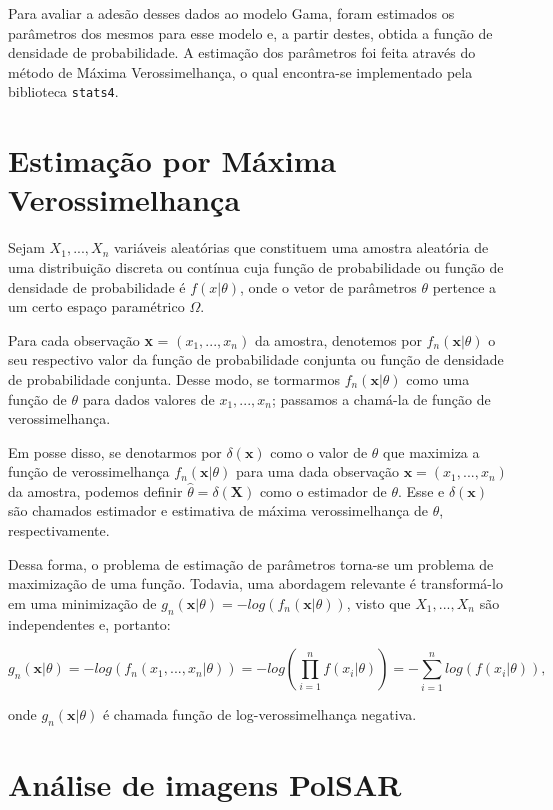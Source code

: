 \documentclass[12pt]{article}
\begin{document}
Para avaliar a adesão desses dados ao modelo Gama, foram estimados os parâmetros dos mesmos para esse modelo e, a partir destes, obtida a função de densidade de probabilidade. A estimação dos parâmetros foi feita através do método de Máxima Verossimelhança, o qual encontra-se implementado pela biblioteca \texttt{stats4}.

\section{Estimação por Máxima Verossimelhança}

Sejam $X_1, ..., X_n$ variáveis aleatórias que constituem uma amostra aleatória de uma distribuição discreta ou contínua cuja função de probabilidade ou função de densidade de probabilidade é $f(x|\theta)$, onde o vetor de parâmetros $\theta$ pertence a um certo espaço paramétrico $\Omega$. 

Para cada observação \textbf{x} = $(x_1, ..., x_n)$ da amostra, denotemos por $f_n(\textbf{x}|\theta)$ o seu respectivo valor da função de probabilidade conjunta ou função de densidade de probabilidade conjunta. Desse modo, se tormarmos $f_n(\textbf{x}|\theta)$ como uma função de $\theta$ para dados valores de $x_1, ..., x_n$; passamos a chamá-la de função de verossimelhança.

Em posse disso, se denotarmos por $\delta(\textbf{x})$ como o valor de $\theta$ que maximiza a função de verossimelhança $f_n(\textbf{x}|\theta)$ para uma dada observação $\textbf{x} = (x_1, ..., x_n)$ da amostra, podemos definir $\widehat{\theta} = \delta(\textbf{X})$ como o estimador de $\theta$. Esse e $\delta(\textbf{x})$ são chamados estimador e estimativa de máxima verossimelhança de $\theta$, respectivamente.

Dessa forma, o problema de estimação de parâmetros torna-se um problema de maximização de uma função. Todavia, uma abordagem relevante é transformá-lo em uma minimização de $g_n(\textbf{x}|\theta) = -log(f_n(\textbf{x}|\theta))$, visto que $X_1, ..., X_n$ são independentes e, portanto: 

\begin{displaymath}
g_n(\textbf{x}|\theta) = -log( f_n(x_1, ..., x_n|\theta) ) = -log( \prod_{i = 1}^{n} f(x_i|\theta) ) = - \sum_{i = 1}^{n} log( f(x_i|\theta) ),
\end{displaymath}

onde $g_n(\textbf{x}|\theta)$ é chamada função de log-verossimelhança negativa.

\section{Análise de imagens PolSAR}
\end{document}

